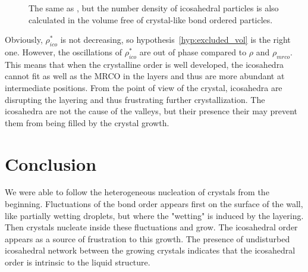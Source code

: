 \begin{figure}
	\centering
	\resizebox{\textwidth}{!}{}
	\caption{The same as , but the number density of icosahedral particles is also calculated in the volume free of crystal-like bond ordered particles.}
	\label{fig:X_profile_normed}
\end{figure}

Obviously, $\rho_{ico}^*$ is not decreasing, so hypothesis~\ref{hyp:excluded_vol} is the right one. However, the oscillations of $\rho_{ico}^*$ are out of phase compared to $\rho$ and $\rho_{mrco}$. This means that when the crystalline order is well developed, the icosahedra cannot fit as well as the \ac{MRCO} in the layers and thus are more abundant at intermediate positions. From the point of view of the crystal, icosahedra are disrupting the layering and thus frustrating further crystallization. The icosahedra are not the cause of the valleys, but their presence their may prevent them from being filled by the crystal growth.

\section{Conclusion}

We were able to follow the heterogeneous nucleation of crystals from the beginning. Fluctuations of the bond order appears first on the surface of the wall, like partially wetting droplets, but where the "wetting" is induced by the layering. Then crystals nucleate inside these fluctuations and grow. The icosahedral order appears as a source of frustration to this growth. The presence of undisturbed icosahedral network between the growing crystals indicates that the icosahedral order is intrinsic to the liquid structure.